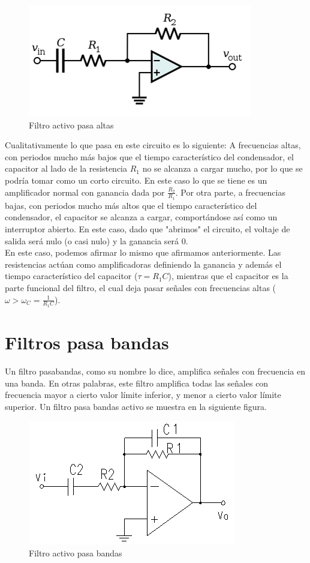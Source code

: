 \documentclass[prb,aps,preprintnumbers,amsmath,amssymb]{revtex4}
\begin{document}
\begin{figure}[h!]
  \centering
  \includegraphics[width=.5\textwidth]{high}
  \caption{Filtro activo pasa altas}
  \label{fig: pasaaltas}
\end{figure}

Cualitativamente lo que pasa en este circuito es lo siguiente: A frecuencias altas, con periodos mucho más bajos que el tiempo característico del condensador, el capacitor al lado de la resistencia $R_1$ no se alcanza a cargar mucho, por lo que se podría tomar como un corto circuito. En este caso lo que se tiene es un amplificador normal con ganancia dada por $\frac{R_2}{R_1}$. Por otra parte, a frecuencias bajas, con periodos mucho más altos que el tiempo característico del condensador, el capacitor se alcanza a cargar, comportándose así como un interruptor abierto. En este caso, dado que "abrimos" el circuito, el voltaje de salida será nulo (o casi nulo) y la ganancia será $0$.\\


En este caso, podemos afirmar lo mismo que afirmamos anteriormente. Las resistencias actúan como amplificadoras definiendo la ganancia y además el tiempo característico del capacitor ($\tau = R_1C$), mientras que el capacitor es la parte funcional del filtro, el cual deja pasar señales con frecuencias altas ($\omega > \omega_C = \frac{1}{R_1C}$).\\

\section{Filtros pasa bandas}
Un filtro pasabandas, como su nombre lo dice, amplifica señales con frecuencia en una banda. En otras palabras, este filtro amplifica todas las señales con frecuencia mayor a cierto valor límite inferior, y menor a cierto valor límite superior. Un filtro pasa bandas activo se muestra en la siguiente figura.\\

\begin{figure}[h!]
  \centering
  \includegraphics[width=.5\textwidth]{band}
  \caption{Filtro activo pasa bandas}
  \label{fig: pasabandas}
\end{figure}
\end{document}
